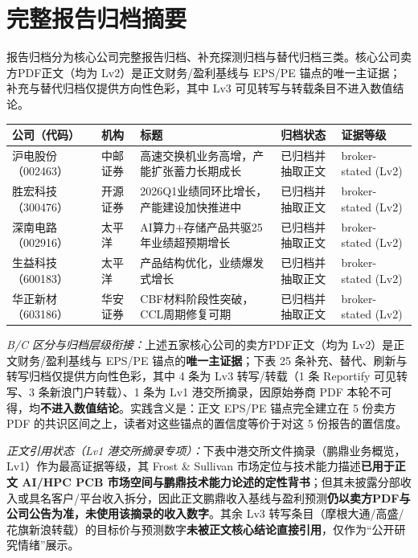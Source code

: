 \section{完整报告归档摘要}

报告归档分为核心公司完整报告归档、补充探测归档与替代归档三类。核心公司卖方PDF正文（均为 Lv2）是正文财务/盈利基线与 EPS/PE 锚点的唯一主证据；补充与替代归档仅提供方向性色彩，其中 Lv3 可见转写与转载条目不进入数值结论。

\begin{exhibitbox}[表 12-3：核心公司完整报告归档]
\small
\begin{tabularx}{\linewidth}{L{1.8cm}L{2.2cm}X L{2.2cm}L{2.0cm}}
\toprule
\textbf{公司（代码）} & \textbf{机构} & \textbf{标题} & \textbf{归档状态} & \textbf{证据等级} \\
\midrule
沪电股份（002463） & 中邮证券 & 高速交换机业务高增，产能扩张蓄力长期成长 & 已归档并抽取正文 & broker-stated (Lv2) \\
胜宏科技（300476） & 开源证券 & 2026Q1业绩同环比增长，产能建设加快推进中 & 已归档并抽取正文 & broker-stated (Lv2) \\
深南电路（002916） & 太平洋 & AI算力+存储产品共驱25年业绩超预期增长 & 已归档并抽取正文 & broker-stated (Lv2) \\
生益科技（600183） & 太平洋 & 产品结构优化，业绩爆发式增长 & 已归档并抽取正文 & broker-stated (Lv2) \\
华正新材（603186） & 华安证券 & CBF材料阶段性突破，CCL周期修复可期 & 已归档并抽取正文 & broker-stated (Lv2) \\
\bottomrule
\end{tabularx}
\end{exhibitbox}

\noindent\textit{B/C 区分与归档层级衔接：}上述五家核心公司的卖方PDF正文（均为 Lv2）是正文财务/盈利基线与 EPS/PE 锚点的\textbf{唯一主证据}；下表 25 条补充、替代、刷新与转写归档仅提供方向性色彩，其中 4 条为 Lv3 转写/转载（1 条 Reportify 可见转写、3 条新浪门户转载）、1 条为 Lv1 港交所摘录，因原始券商 PDF 本轮不可得，均\textbf{不进入数值结论}。实践含义是：正文 EPS/PE 锚点完全建立在 5 份卖方 PDF 的共识区间之上，读者对这些锚点的置信度等价于对这 5 份报告的置信度。

\noindent\textit{正文引用状态（Lv1 港交所摘录专项）：}下表中港交所文件摘录（鹏鼎业务概览，Lv1）作为最高证据等级，其 Frost \& Sullivan 市场定位与技术能力描述\textbf{已用于正文 AI/HPC PCB 市场空间与鹏鼎技术能力论述的定性背书}；但其未披露分部收入或具名客户/平台收入拆分，因此正文鹏鼎收入基线与盈利预测\textbf{仍以卖方PDF与公司公告为准，未使用该摘录的收入数字}。其余 Lv3 转写条目（摩根大通/高盛/花旗新浪转载）的目标价与预测数字\textbf{未被正文核心结论直接引用}，仅作为``公开研究情绪''展示。

